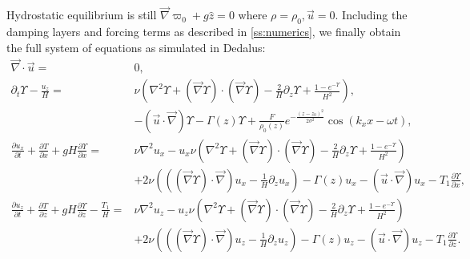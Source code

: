\documentclass[
        fleqn,
        usenatbib,
    ]{mnras}
\newcommand*{\pd}[2]{\frac{\partial#1}{\partial#2}}
\newcommand*{\p}[1]{\left(#1\right)}
\begin{document}
Hydrostatic equilibrium is still $\vec{\nabla} \varpi_0 + g\hat{z} = 0$ where
$\rho = \rho_0, \vec{u} = 0$. Including the damping layers and forcing terms as
described in \autoref{ss:numerics}, we finally obtain the full system of
equations as simulated in Dedalus:
\begin{subequations}
    \begin{align}
        \vec{\nabla} \cdot \vec{u} ={}& 0,\\
        \partial_t \Upsilon - \frac{u_z}{H}
            ={}& \nu\p{\nabla^2 \Upsilon + \p{\vec{\nabla}
            \Upsilon} \cdot \p{\vec{\nabla}\Upsilon} - \frac{2}{H}\partial_z
            \Upsilon + \frac{1 - e^{-\Upsilon}}{H^2}},\nonumber\\
            & - \p{\vec{u} \cdot \vec{\nabla}}\Upsilon
                -\Gamma(z) \Upsilon
                + \frac{F}{\rho_0(z)}e^{-\frac{(z - z_0)^2}{2\sigma^2}}
                    \cos \p{k_xx - \omega t},\\
        \pd{u_x}{t} + \pd{T}{x} + gH\pd{\Upsilon}{x} ={}&
            \nu \nabla^2 u_x
            - u_x \nu\p{\nabla^2 \Upsilon + \p{\vec{\nabla} \Upsilon} \cdot
                \p{\vec{\nabla}\Upsilon} - \frac{2}{H}\partial_z \Upsilon
                + \frac{1 - e^{-\Upsilon}}{H^2}}\nonumber\\
            &+ 2\nu \p{\p{\p{\vec{\nabla}\Upsilon} \cdot \vec{\nabla}}u_x
                - \frac{1}{H}\partial_z u_x}
            -\Gamma(z) u_x
                - \p{\vec{u} \cdot \vec{\nabla}}u_x
                - T_1 \pd{\Upsilon}{x},\\
        \pd{u_z}{t} + \pd{T}{z} + gH\pd{\Upsilon}{z} - \frac{T_1}{H} ={}&
            \nu \nabla^2 u_z
            - u_z \nu\p{\nabla^2 \Upsilon + \p{\vec{\nabla} \Upsilon} \cdot
                \p{\vec{\nabla}\Upsilon} - \frac{2}{H}\partial_z \Upsilon
                + \frac{1 - e^{-\Upsilon}}{H^2}}\nonumber\\
            &+ 2\nu \p{\p{\p{\vec{\nabla}\Upsilon} \cdot \vec{\nabla}}u_z -
                \frac{1}{H}\partial_z u_{z}}
            -\Gamma(z) u_z - \p{\vec{u} \cdot \vec{\nabla}}u_z
            - T_1 \pd{\Upsilon}{z}.
    \end{align}
\end{subequations}
\label{lastpage} %
\end{document}
